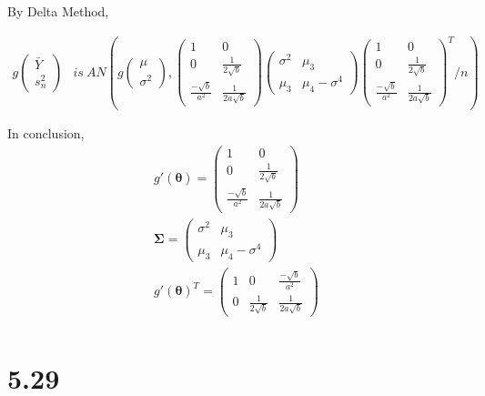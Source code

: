 \documentclass[
  letterpaper,
  DIV=11,
  numbers=noendperiod]{scrreprt}
\begin{document}
By Delta Method,

\[\begin{aligned}
g\begin{pmatrix} \bar Y \\  s_n^2 \end{pmatrix} & is~ AN\left( g \begin{pmatrix} \mu \\  \sigma^2\end{pmatrix}, \begin{pmatrix} 1 & 0 \\ 0 & \frac{1}{2 \sqrt b} \\ \frac{-\sqrt b}{a^2} & \frac{1}{2a\sqrt b}\end{pmatrix}\begin{pmatrix} \sigma^2 & \mu_3 \\ \mu_3 & \mu_4-\sigma^4 \end{pmatrix} \begin{pmatrix} 1 & 0 \\ 0 & \frac{1}{2 \sqrt b} \\ \frac{-\sqrt b}{a^2} & \frac{1}{2a\sqrt b}\end{pmatrix}^T/n\right)
\end{aligned}\]

In conclusion, \[ \begin{aligned}
g'(\boldsymbol \theta) =\begin{pmatrix} 1 & 0 \\ 0 & \frac{1}{2 \sqrt b} \\ \frac{-\sqrt b}{a^2} & \frac{1}{2a\sqrt b}\end{pmatrix} \\
\boldsymbol \Sigma = \begin{pmatrix} \sigma^2 & \mu_3 \\ \mu_3 & \mu_4-\sigma^4 \end{pmatrix} \\
g'(\boldsymbol \theta)^T =\begin{pmatrix} 1 & 0 &  \frac{-\sqrt b}{a^2} \\ 0 & \frac{1}{2 \sqrt b} & \frac{1}{2a\sqrt b}\end{pmatrix} \\
 \end{aligned}\]

\newpage

\hypertarget{section-32}{%
\section{5.29}\label{section-32}}
\end{document}
